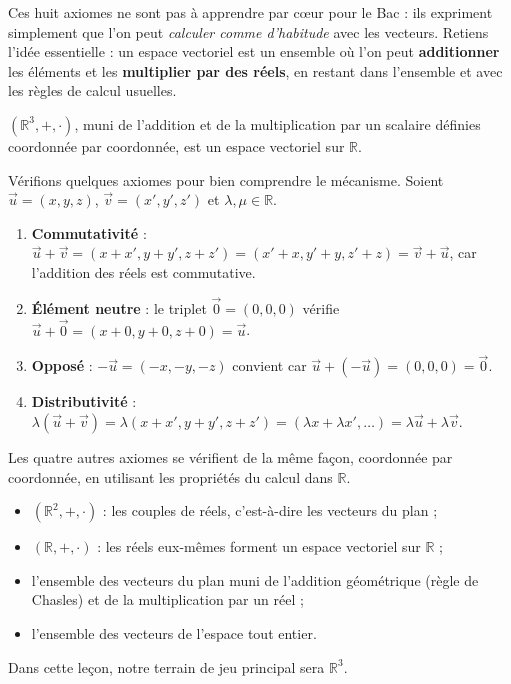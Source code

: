\documentclass[11pt]{article}
\begin{document}
\begin{attention}
Ces huit axiomes ne sont pas à apprendre par cœur pour le Bac : ils expriment simplement que l'on peut \emph{calculer comme d'habitude} avec les vecteurs. Retiens l'idée essentielle : un espace vectoriel est un ensemble où l'on peut \textbf{additionner} les éléments et les \textbf{multiplier par des réels}, en restant dans l'ensemble et avec les règles de calcul usuelles.
\end{attention}

\begin{propriete}
$(\mathbb{R}^3, +, \cdot)$, muni de l'addition et de la multiplication par un scalaire définies coordonnée par coordonnée, est un espace vectoriel sur $\mathbb{R}$.
\end{propriete}

\begin{experience}
Vérifions quelques axiomes pour bien comprendre le mécanisme. Soient $\vec{u} = (x,y,z)$, $\vec{v} = (x',y',z')$ et $\lambda, \mu \in \mathbb{R}$.
\begin{enumerate}
\item \textbf{Commutativité} : $\vec{u} + \vec{v} = (x+x', y+y', z+z') = (x'+x, y'+y, z'+z) = \vec{v}+\vec{u}$, car l'addition des réels est commutative.
\item \textbf{Élément neutre} : le triplet $\vec{0} = (0,0,0)$ vérifie $\vec{u} + \vec{0} = (x+0, y+0, z+0) = \vec{u}$.
\item \textbf{Opposé} : $-\vec{u} = (-x,-y,-z)$ convient car $\vec{u} + (-\vec{u}) = (0,0,0) = \vec{0}$.
\item \textbf{Distributivité} : $\lambda(\vec{u}+\vec{v}) = \lambda(x+x', y+y', z+z') = (\lambda x + \lambda x', \ldots) = \lambda\vec{u} + \lambda\vec{v}$.
\end{enumerate}
Les quatre autres axiomes se vérifient de la même façon, coordonnée par coordonnée, en utilisant les propriétés du calcul dans $\mathbb{R}$.
\end{experience}

\begin{exemplebox}
\begin{itemize}
\item $(\mathbb{R}^2, +, \cdot)$ : les couples de réels, c'est-à-dire les vecteurs du plan ;
\item $(\mathbb{R}, +, \cdot)$ : les réels eux-mêmes forment un espace vectoriel sur $\mathbb{R}$ ;
\item l'ensemble des vecteurs du plan muni de l'addition géométrique (règle de Chasles) et de la multiplication par un réel ;
\item l'ensemble des vecteurs de l'espace tout entier.
\end{itemize}
Dans cette leçon, notre terrain de jeu principal sera $\mathbb{R}^3$.
\end{exemplebox}
\end{document}

